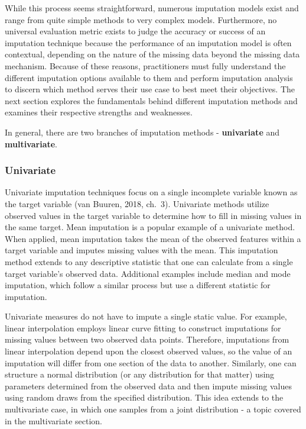 \documentclass[12pt,oneside]{chicagocapstone}
\begin{document}
While this process seems straightforward, numerous imputation models
exist and range from quite simple methods to very complex models.
Furthermore, no universal evaluation metric exists to judge the accuracy
or success of an imputation technique because the performance of an
imputation model is often contextual, depending on the nature of the
missing data beyond the missing data mechanism. Because of these
reasons, practitioners must fully understand the different imputation
options available to them and perform imputation analysis to discern
which method serves their use case to best meet their objectives. The
next section explores the fundamentals behind different imputation
methods and examines their respective strengths and weaknesses.

In general, there are two branches of imputation methods -
\textbf{univariate} and \textbf{multivariate}.

\subsubsection*{Univariate}\label{univariate}

Univariate imputation techniques focus on a single incomplete variable
known as the target variable (van Buuren, 2018, ch.~3). Univariate
methods utilize observed values in the target variable to determine how
to fill in missing values in the same target. Mean imputation is a
popular example of a univariate method. When applied, mean imputation
takes the mean of the observed features within a target variable and
imputes missing values with the mean. This imputation method extends to
any descriptive statistic that one can calculate from a single target
variable's observed data. Additional examples include median and mode
imputation, which follow a similar process but use a different statistic
for imputation.

Univariate measures do not have to impute a single static value. For
example, linear interpolation employs linear curve fitting to construct
imputations for missing values between two observed data points.
Therefore, imputations from linear interpolation depend upon the closest
observed values, so the value of an imputation will differ from one
section of the data to another. Similarly, one can structure a normal
distribution (or any distribution for that matter) using parameters
determined from the observed data and then impute missing values using
random draws from the specified distribution. This idea extends to the
multivariate case, in which one samples from a joint distribution - a
topic covered in the multivariate section.
\end{document}
